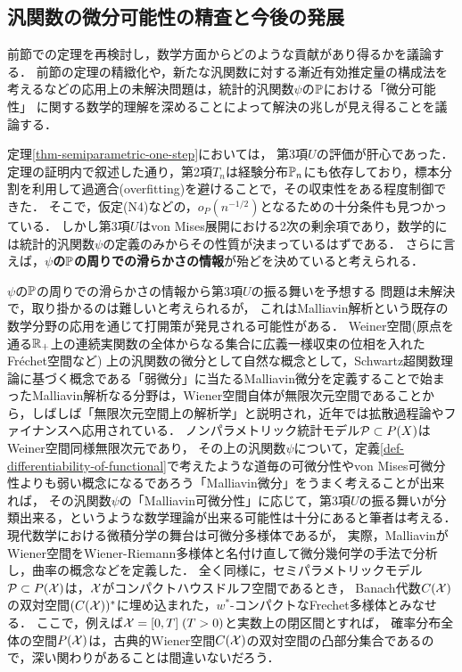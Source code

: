 \documentclass[uplatex, dvipdfmx]{jsarticle}
\begin{document}
\subsection{汎関数の微分可能性の精査と今後の発展}\label{subsection-Malliavin}

\begin{tcolorbox}[colframe=ForestGreen, colback=ForestGreen!10!white,breakable,colbacktitle=ForestGreen!40!white,coltitle=black,fonttitle=\bfseries\sffamily,
title=]
    前節での定理を再検討し，数学方面からどのような貢献があり得るかを議論する．
    前節の定理の精緻化や，新たな汎関数に対する漸近有効推定量の構成法を考えるなどの応用上の未解決問題は，統計的汎関数$\psi$の$\bP$における「微分可能性」
    に関する数学的理解を深めることによって解決の兆しが見え得ることを議論する．
\end{tcolorbox}

定理\ref{thm-semiparametric-one-step}においては，
第3項$U$の評価が肝心であった．
定理の証明内で叙述した通り，第2項$T_n$は経験分布$\bP_n$にも依存しており，標本分割を利用して過適合(overfitting)を避けることで，その収束性をある程度制御できた．
そこで，仮定(N4)などの，$o_P(n^{-1/2})$となるための十分条件も見つかっている\cite{Kennedy et al}．
しかし第3項$U$はvon Mises展開における2次の剰余項であり，数学的には統計的汎関数$\psi$の定義のみからその性質が決まっているはずである．
さらに言えば，\textbf{$\psi$の$\bP$の周りでの滑らかさの情報}が殆どを決めていると考えられる．

$\psi$の$\bP$の周りでの滑らかさの情報から第3項$U$の振る舞いを予想する
問題は未解決で，取り掛かるのは難しいと考えられるが，
これはMalliavin解析という既存の数学分野の応用を通じて打開策が発見される可能性がある．
Weiner空間(原点を通る$\R_+$上の連続実関数の全体からなる集合に広義一様収束の位相を入れたFréchet空間など)
上の汎関数の微分として自然な概念として，Schwartz超関数理論に基づく概念である「弱微分」に当たるMalliavin微分を定義することで始まったMalliavin解析なる分野は，Wiener空間自体が無限次元空間であることから，しばしば「無限次元空間上の解析学」と説明され，近年では拡散過程論やファイナンスへ応用されている\cite{Shinzo Watanabe}．
ノンパラメトリック統計モデル$\P\subset P(X)$はWeiner空間同様無限次元であり，
その上の汎関数$\psi$について，定義\ref{def-differentiability-of-functional}で考えたような道毎の可微分性やvon Mises可微分性よりも弱い概念になるであろう「Malliavin微分」をうまく考えることが出来れば，
その汎関数$\psi$の「Malliavin可微分性」に応じて，第3項$U$の振る舞いが分類出来る，というような数学理論が出来る可能性は十分にあると筆者は考える．
現代数学における微積分学の舞台は可微分多様体であるが，
実際，MalliavinがWiener空間をWiener-Riemann多様体と名付け直して微分幾何学の手法で分析し，曲率の概念などを定義した\cite{Malliavin}．
全く同様に，セミパラメトリックモデル$\P\subset P(\X)$は，$\X$がコンパクトハウスドルフ空間であるとき，
Banach代数$C(\X)$の双対空間$(C(\X))^*$に埋め込まれた，$w^*$-コンパクトなFrechet多様体とみなせる\cite{Pedersen}．
ここで，例えば$\X=[0,T]\;(T>0)$と実数上の閉区間とすれば，
確率分布全体の空間$P(\X)$は，古典的Wiener空間$C(\X)$の双対空間の凸部分集合であるので，深い関わりがあることは間違いないだろう．
\end{document}
